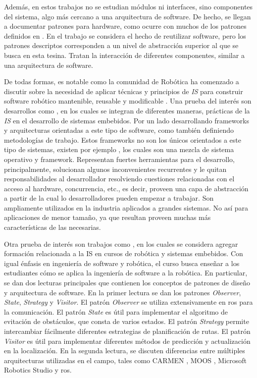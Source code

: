 Además, en estos trabajos no se estudian módulos ni interfaces, sino componentes del sistema, algo más cercano a una arquitectura de software. De hecho, se llegan a documentar patrones para hardware, como ocurre con muchos de los patrones definidos en \cite{critical}. En el trabajo \cite{stable} se considera el hecho de reutilizar software, pero los patrones descriptos corresponden a un nivel de abstracción superior al que se busca en esta tesina. Tratan la interacción de diferentes componentes, similar a una arquitectura de software.

De todas formas, es notable como la comunidad de Robótica ha comenzado a discutir sobre la necesidad de aplicar técnicas y principios de \textit{IS} para construir software robótico mantenible, reusable y modificable \cite{mejoras-1, mejoras-2}. Una prueba del interés son desarrollos como \cite{FernandezMadrigal2003, model,model1,model2,model3}, en los cuales se integran de diferentes maneras, prácticas de la \textit{IS} en el desarrollo de sistemas embebidos. Por un lado desarrollando \glspl{framework} y arquitecturas orientadas a este tipo de software, como también definiendo metodologías de trabajo. Estos \glspl{framework} no son los únicos orientados a este tipo de sistemas, existen por ejemplo \cite{framework-1, framework-ros}, los cuales son una mezcla de sistema operativo y framework. Representan fuertes herramientas para el desarrollo, principalmente, solucionan algunos inconvenientes recurrentes y le quitan responsabilidades al desarrollador resolviendo cuestiones relacionadas con el acceso al hardware, concurrencia, etc., es decir, proveen una capa de abstracción a partir de la cual lo desarrolladores pueden empezar a trabajar. Son ampliamente utilizados en la industria aplicados a grandes sistemas. No así para aplicaciones de menor tamaño, ya que resultan proveen muchas más características de las necesarias.

Otra prueba de interés son trabajos como \cite{Shin15fase}, en los cuales se considera agregar formación relacionada a la IS en cursos de robótica y sistemas embebidos. Con igual énfasis en ingeniería de software y robótica, el curso busca enseñar a los estudiantes cómo se aplica la ingeniería de software a la robótica. En particular, se dan dos lecturas principales que contienen los conceptos de patrones de diseño y arquitectura de software. En la primer lectura se dan los patrones \textit{Observer}, \textit{State}, \textit{Strategy} y \textit{Visitor}. El patrón \textit{Observer} se utiliza extensivamente en \gls{ros} para la comunicación. El patrón \textit{State} es útil para implementar el algoritmo de evitación de obstáculos, que consta de varios estados. El patrón \textit{Strategy} permite intercambiar fácilmente diferentes estrategias de planificación de rutas. El patrón \textit{Visitor} es útil para implementar diferentes métodos de predicción y actualización en la localización. En la segunda lectura, se discuten diferencias entre múltiples arquitecturas utilizadas en el campo, tales como CARMEN \cite{carmen}, MOOS \cite{moos}, Microsoft Robotics Studio \cite{microsoft} y \gls{ros}. 

